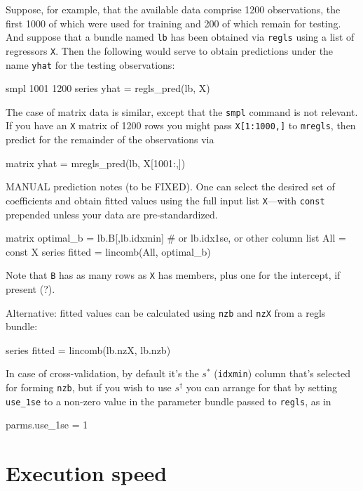 \documentclass{article}
\begin{document}
Suppose, for example, that the available data comprise 1200
observations, the first 1000 of which were used for training and 200
of which remain for testing. And suppose that a bundle named
\texttt{lb} has been obtained via \texttt{regls} using a list of
regressors \texttt{X}. Then the following would serve to obtain
predictions under the name \texttt{yhat} for the testing observations:
\begin{code}
smpl 1001 1200
series yhat = regls_pred(lb, X)
\end{code}
The case of matrix data is similar, except that the \texttt{smpl}
command is not relevant. If you have an \texttt{X} matrix of 1200 rows
you might pass \texttt{X[1:1000,]} to \texttt{mregls}, then predict
for the remainder of the observations via
\begin{code}
matrix yhat = mregls_pred(lb, X[1001:,])
\end{code}

MANUAL prediction notes (to be FIXED).  One can select the desired set
of coefficients and obtain fitted values using the full input list
\texttt{X}---with \texttt{const} prepended unless your data are
pre-standardized.
\begin{code}
matrix optimal_b = lb.B[,lb.idxmin] # or lb.idx1se, or other column
list All = const X
series fitted = lincomb(All, optimal_b)
\end{code}
Note that \texttt{B} has as many rows as \texttt{X} has members, plus
one for the intercept, if present (?).

Alternative: fitted values can be calculated using \texttt{nzb} and
\texttt{nzX} from a regls bundle:
\begin{code}
series fitted = lincomb(lb.nzX, lb.nzb)
\end{code}
In case of cross-validation, by default it's the $s^*$
(\texttt{idxmin}) column that's selected for forming \texttt{nzb}, but
if you wish to use $s^{\dagger}$ you can arrange for that by setting
\texttt{use\_1se} to a non-zero value in the parameter bundle passed
to \texttt{regls}, as in
\begin{code}
parms.use_1se = 1
\end{code}

\section{Execution speed}
\label{sec:speed}
\end{document}
